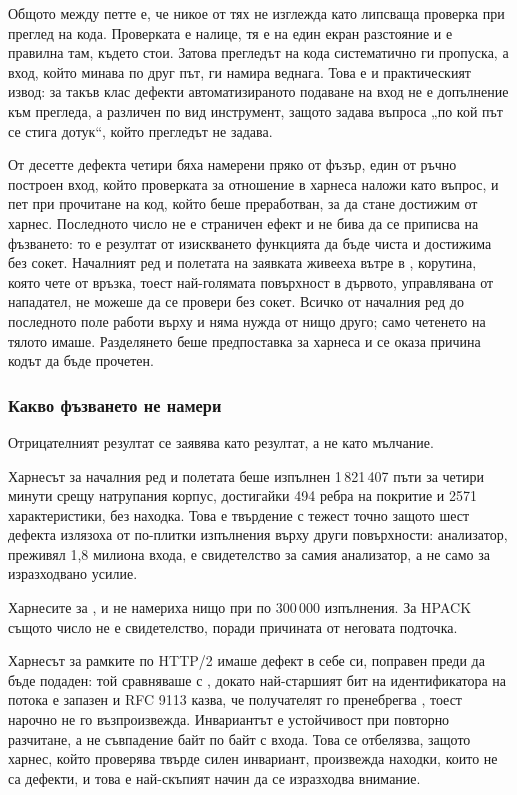 Общото между петте е, че никое от тях не изглежда като липсваща проверка при преглед на кода.
Проверката е налице, тя е на един екран разстояние и е правилна там, където стои. Затова
прегледът на кода систематично ги пропуска, а вход, който минава по друг път, ги намира
веднага. Това е и практическият извод: за такъв клас дефекти автоматизираното подаване на
вход не е допълнение към прегледа, а различен по вид инструмент, защото задава въпроса „по
кой път се стига дотук“, който прегледът не задава.

От десетте дефекта четири бяха намерени пряко от фъзър, един от ръчно построен вход, който
проверката за отношение в харнеса наложи като въпрос, и пет при прочитане на код, който беше
преработван, за да стане достижим от харнес. Последното число не е страничен ефект и не бива
да се приписва на фъзването: то е резултат от изискването функцията да бъде чиста и достижима
без сокет. Началният ред и полетата на заявката живееха вътре в ,
корутина, която чете от връзка, тоест най-голямата повърхност в дървото, управлявана от
нападател, не можеше да се провери без сокет. Всичко от началния ред до последното поле
работи върху  и няма нужда от нищо друго; само четенето на тялото имаше.
Разделянето беше предпоставка за харнеса и се оказа причина кодът да бъде прочетен.

\subsubsection{Какво фъзването не намери}

Отрицателният резултат се заявява като резултат, а не като мълчание.

Харнесът за началния ред и полетата беше изпълнен 1\,821\,407 пъти за четири минути срещу
натрупания корпус, достигайки 494 ребра на покритие и 2571 характеристики, без находка. Това
е твърдение с тежест точно защото шест дефекта излязоха от по-плитки изпълнения върху други
повърхности: анализатор, преживял 1,8 милиона входа, е свидетелство за самия анализатор, а не
само за изразходвано усилие.

Харнесите за ,  и  не намериха нищо при по
300\,000 изпълнения. За HPACK същото число не е свидетелство, поради причината от неговата
подточка.

Харнесът за рамките по HTTP/2 имаше дефект в себе си, поправен преди да бъде подаден: той
сравняваше  с , докато най-старшият бит на идентификатора
на потока е запазен и RFC 9113 казва, че получателят го пренебрегва \cite{rfc9113}, тоест
 нарочно не го възпроизвежда. Инвариантът е устойчивост при повторно
разчитане, а не съвпадение байт по байт с входа. Това се отбелязва, защото харнес, който
проверява твърде силен инвариант, произвежда находки, които не са дефекти, и това е
най-скъпият начин да се изразходва внимание.

